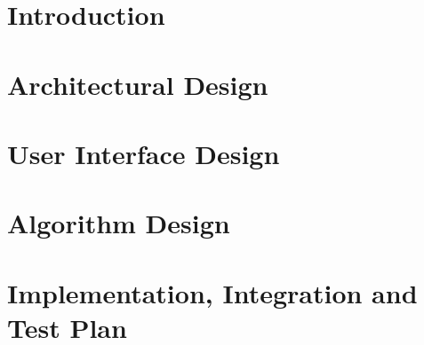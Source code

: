 \setcounter{page}{2}


\newpage
\tableofcontents
\newpage
{}
{}
\listoffigures
{}
{}
\listoftables

\clearpage
\section{Introduction}
\label{sect:introduction}


\clearpage
\section{Architectural Design}
\label{sect:architecture}


\clearpage
\section{User Interface Design}
\label{sect:ui}


\clearpage
\section{Algorithm Design}
\label{sect:algorithm}


\clearpage
\section{Implementation, Integration and Test Plan}
\label{sect:implementation}


